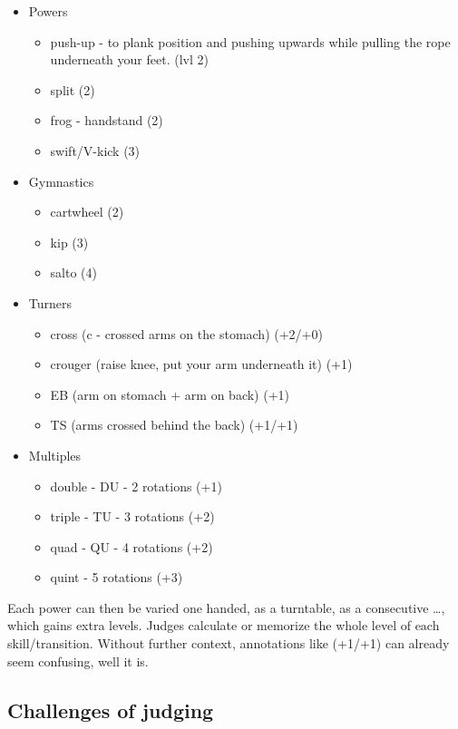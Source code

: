 \begin{itemize}
    \item Powers
    \begin{itemize}
        \item push-up - to plank position and pushing upwards while pulling the rope underneath your feet. (lvl 2)
        \item split (2)
        \item frog - handstand (2)
        \item swift/V-kick (3)
    \end{itemize}
    \item Gymnastics
    \begin{itemize}
        \item cartwheel (2)
        \item kip (3)
        \item salto (4)
    \end{itemize}
    \item Turners
    \begin{itemize}
        \item cross (c - crossed arms on the stomach) (+2/+0)
        \item crouger (raise knee, put your arm underneath it) (+1)
        \item EB (arm on stomach + arm on back) (+1)
        \item TS (arms crossed behind the back) (+1/+1)
    \end{itemize}
    \item Multiples
    \begin{itemize}
        \item double - DU - 2 rotations (+1)
        \item triple - TU - 3 rotations (+2)
        \item quad - QU - 4 rotations (+2)
        \item quint - 5 rotations (+3)
    \end{itemize}
\end{itemize}

Each power can then be varied one handed, as a turntable, as a consecutive \dots, which gains extra levels. Judges calculate or memorize the whole level of each skill/transition. Without further context, annotations like (+1/+1) can already seem confusing, well it is.



\subsection{Challenges of judging}
\label{proposal-subsubsec:literature-judge-challenges}

